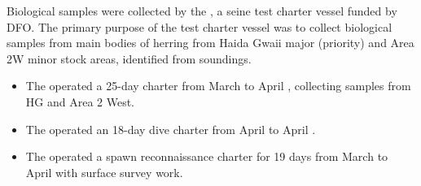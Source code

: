Biological samples were collected by the ,
a seine test charter vessel funded by DFO.
The primary purpose of the test charter vessel was to
collect biological samples from main bodies of herring from
Haida Gwaii major (priority) and Area 2W minor stock areas,
identified from soundings.

\begin{itemize}

\item The  operated a 25-day charter
from March  to April , collecting samples from HG and Area 2 West.

\item The  operated an 18-day dive charter
from April  to April .

\item The  operated a spawn reconnaissance charter
for 19 days from March  to April  with surface survey work.

\end{itemize}

